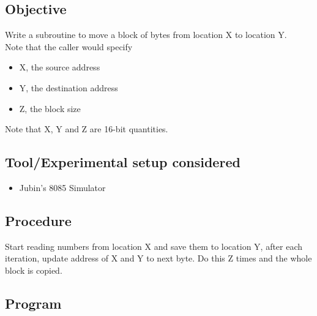 \documentclass[a4paper]{article} %
\begin{document}
    \subsection{Objective}
        Write a subroutine to move a block of bytes from location X to location Y.\\
        Note that the caller would specify
        \begin{itemize}
            \item X, the source address
            \item Y, the destination address
            \item Z, the block size
        \end{itemize}
        Note that X, Y and Z are 16-bit quantities.
    \subsection{Tool/Experimental setup considered}
        \begin{itemize}
            \item Jubin's 8085 Simulator
        \end{itemize}
    \subsection{Procedure}
        Start reading numbers from location X and save them to location Y, after each iteration, update address of X and Y to next byte. Do this Z times and the whole block is copied.
    \subsection{Program}
        
        \newpage
\end{document}
